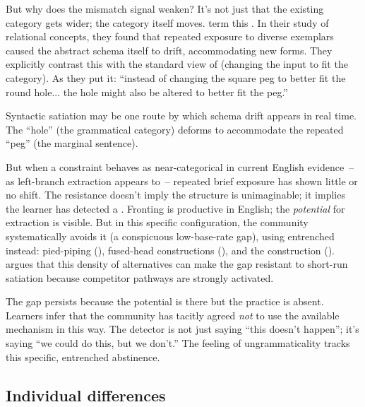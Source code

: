 But why does the mismatch signal weaken? It's not just that the existing category gets wider; the category itself moves. \textcite{vagninoWalker2026} term this . In their study of relational concepts, they found that repeated exposure to diverse exemplars caused the abstract schema itself to drift, accommodating new forms. They explicitly contrast this with the standard view of  (changing the input to fit the category). As they put it: \enquote{instead of changing the square peg to better fit the round hole... the hole might also be altered to better fit the peg.}

Syntactic satiation may be one route by which schema drift appears in real time. The \enquote{hole} (the grammatical category) deforms to accommodate the repeated \enquote{peg} (the marginal sentence).

But when a constraint behaves as near-categorical in current English evidence~-- as left-branch extraction appears to~-- repeated brief exposure has shown little or no shift. The resistance doesn't imply the structure is unimaginable; it implies the learner has detected a . Fronting is productive in English; the \emph{potential} for extraction is visible. But in this specific configuration, the community systematically avoids it (a conspicuous low-base-rate gap), using entrenched  instead: pied-piping (), fused-head constructions (), and the  construction (). \textcite{reynolds2026lbe} argues that this density of alternatives can make the gap resistant to short-run satiation because competitor pathways are strongly activated.

The gap persists because the potential is there but the practice is absent. Learners infer that the community has tacitly agreed \emph{not} to use the available mechanism in this way. The detector is not just saying \enquote{this doesn't happen}; it's saying \enquote{we could do this, but we don't.} The feeling of ungrammaticality tracks this specific, entrenched abstinence.

\subsection{Individual differences}
\label{sec:14:individual-differences}

